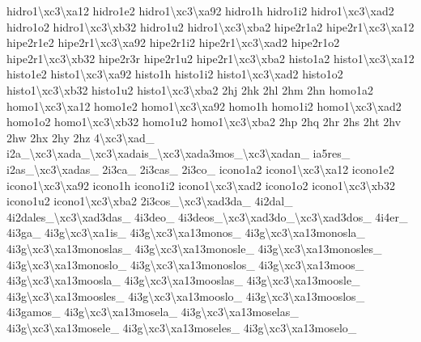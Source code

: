 \begin{DoxyCompactItemize}
hidro1\textbackslash{}xc3\textbackslash{}xa12 hidro1e2 hidro1\textbackslash{}xc3\textbackslash{}xa92 hidro1h hidro1i2 hidro1\textbackslash{}xc3\textbackslash{}xad2 hidro1o2 hidro1\textbackslash{}xc3\textbackslash{}xb32 hidro1u2 hidro1\textbackslash{}xc3\textbackslash{}xba2 hipe2r1a2 hipe2r1\textbackslash{}xc3\textbackslash{}xa12 hipe2r1e2 hipe2r1\textbackslash{}xc3\textbackslash{}xa92 hipe2r1i2 hipe2r1\textbackslash{}xc3\textbackslash{}xad2 hipe2r1o2 hipe2r1\textbackslash{}xc3\textbackslash{}xb32 hipe2r3r hipe2r1u2 hipe2r1\textbackslash{}xc3\textbackslash{}xba2 histo1a2 histo1\textbackslash{}xc3\textbackslash{}xa12 histo1e2 histo1\textbackslash{}xc3\textbackslash{}xa92 histo1h histo1i2 histo1\textbackslash{}xc3\textbackslash{}xad2 histo1o2 histo1\textbackslash{}xc3\textbackslash{}xb32 histo1u2 histo1\textbackslash{}xc3\textbackslash{}xba2 2hj 2hk 2hl 2hm 2hn homo1a2 homo1\textbackslash{}xc3\textbackslash{}xa12 homo1e2 homo1\textbackslash{}xc3\textbackslash{}xa92 homo1h homo1i2 homo1\textbackslash{}xc3\textbackslash{}xad2 homo1o2 homo1\textbackslash{}xc3\textbackslash{}xb32 homo1u2 homo1\textbackslash{}xc3\textbackslash{}xba2 2hp 2hq 2hr 2hs 2ht 2hv 2hw 2hx 2hy 2hz 4\textbackslash{}xc3\textbackslash{}xad\-\_\- i2a\-\_\textbackslash{}xc3\textbackslash{}xada\-\_\textbackslash{}xc3\textbackslash{}xadais\-\_\textbackslash{}xc3\textbackslash{}xada3mos\-\_\textbackslash{}xc3\textbackslash{}xadan\-\_\- ia5res\-\_\- i2as\-\_\textbackslash{}xc3\textbackslash{}xadas\-\_\- 2i3ca\-\_\- 2i3cas\-\_\- 2i3co\-\_\- icono1a2 icono1\textbackslash{}xc3\textbackslash{}xa12 icono1e2 icono1\textbackslash{}xc3\textbackslash{}xa92 icono1h icono1i2 icono1\textbackslash{}xc3\textbackslash{}xad2 icono1o2 icono1\textbackslash{}xc3\textbackslash{}xb32 icono1u2 icono1\textbackslash{}xc3\textbackslash{}xba2 2i3cos\-\_\textbackslash{}xc3\textbackslash{}xad3da\-\_\- 4i2dal\-\_\- 4i2dales\-\_\textbackslash{}xc3\textbackslash{}xad3das\-\_\- 4i3deo\-\_\- 4i3deos\-\_\textbackslash{}xc3\textbackslash{}xad3do\-\_\textbackslash{}xc3\textbackslash{}xad3dos\-\_\- 4i4er\-\_\- 4i3ga\-\_\- 4i3g\textbackslash{}xc3\textbackslash{}xa1is\-\_\- 4i3g\textbackslash{}xc3\textbackslash{}xa13monos\-\_\- 4i3g\textbackslash{}xc3\textbackslash{}xa13monosla\-\_\- 4i3g\textbackslash{}xc3\textbackslash{}xa13monoslas\-\_\- 4i3g\textbackslash{}xc3\textbackslash{}xa13monosle\-\_\- 4i3g\textbackslash{}xc3\textbackslash{}xa13monosles\-\_\- 4i3g\textbackslash{}xc3\textbackslash{}xa13monoslo\-\_\- 4i3g\textbackslash{}xc3\textbackslash{}xa13monoslos\-\_\- 4i3g\textbackslash{}xc3\textbackslash{}xa13moos\-\_\- 4i3g\textbackslash{}xc3\textbackslash{}xa13moosla\-\_\- 4i3g\textbackslash{}xc3\textbackslash{}xa13mooslas\-\_\- 4i3g\textbackslash{}xc3\textbackslash{}xa13moosle\-\_\- 4i3g\textbackslash{}xc3\textbackslash{}xa13moosles\-\_\- 4i3g\textbackslash{}xc3\textbackslash{}xa13mooslo\-\_\- 4i3g\textbackslash{}xc3\textbackslash{}xa13mooslos\-\_\- 4i3gamos\-\_\- 4i3g\textbackslash{}xc3\textbackslash{}xa13mosela\-\_\- 4i3g\textbackslash{}xc3\textbackslash{}xa13moselas\-\_\- 4i3g\textbackslash{}xc3\textbackslash{}xa13mosele\-\_\- 4i3g\textbackslash{}xc3\textbackslash{}xa13moseles\-\_\- 4i3g\textbackslash{}xc3\textbackslash{}xa13moselo\-\_\- 
\end{DoxyCompactItemize}
